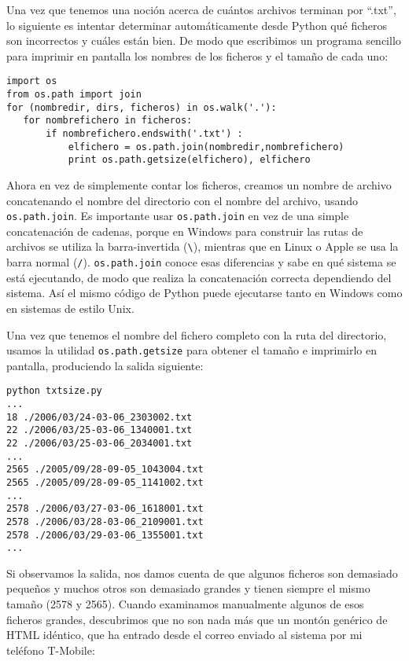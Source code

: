 Una vez que tenemos una noción acerca de cuántos archivos terminan por ``.txt'', lo
siguiente es intentar determinar automáticamente
desde Python qué ficheros son incorrectos y cuáles están bien.
De modo que escribimos un programa sencillo para imprimir en pantalla los
nombres de los ficheros y el tamaño de cada uno:

\beforeverb
\begin{verbatim}
import os
from os.path import join
for (nombredir, dirs, ficheros) in os.walk('.'):
   for nombrefichero in ficheros:
       if nombrefichero.endswith('.txt') :
           elfichero = os.path.join(nombredir,nombrefichero)
           print os.path.getsize(elfichero), elfichero
\end{verbatim}
\afterverb
%
Ahora en vez de simplemente contar los ficheros, creamos
un nombre de archivo concatenando el nombre del directorio con
el nombre del archivo, usando {\tt os.path.join}.
Es importante usar
{\tt os.path.join} en vez de una simple concatenación de cadenas,
porque en Windows para construir las rutas de archivos
se utiliza la barra-invertida (\verb"\"), mientras que en Linux
o Apple se usa la barra normal (\verb"/").
{\tt os.path.join} conoce esas diferencias y sabe en qué
sistema se está ejecutando, de modo que realiza la concatenación correcta
dependiendo del sistema. Así el mismo código de Python
puede ejecutarse tanto en Windows como en sistemas de estilo Unix.

Una vez que tenemos el nombre del fichero completo con la ruta
del directorio, usamos la utilidad {\tt os.path.getsize}
para obtener el tamaño e imprimirlo en pantalla, produciendo la
salida siguiente:

\beforeverb
\begin{verbatim}
python txtsize.py
...
18 ./2006/03/24-03-06_2303002.txt
22 ./2006/03/25-03-06_1340001.txt
22 ./2006/03/25-03-06_2034001.txt
...
2565 ./2005/09/28-09-05_1043004.txt
2565 ./2005/09/28-09-05_1141002.txt
...
2578 ./2006/03/27-03-06_1618001.txt
2578 ./2006/03/28-03-06_2109001.txt
2578 ./2006/03/29-03-06_1355001.txt
...
\end{verbatim}
\afterverb
%
Si observamos la salida, nos damos cuenta de que algunos ficheros son demasiado pequeños y
muchos otros son demasiado grandes y tienen siempre el mismo tamaño (2578 y 2565).
Cuando examinamos manualmente algunos de esos ficheros grandes,
descubrimos que no son nada más que un montón genérico de HTML idéntico, que ha entrado
desde el correo enviado al sistema por mi teléfono T-Mobile:

